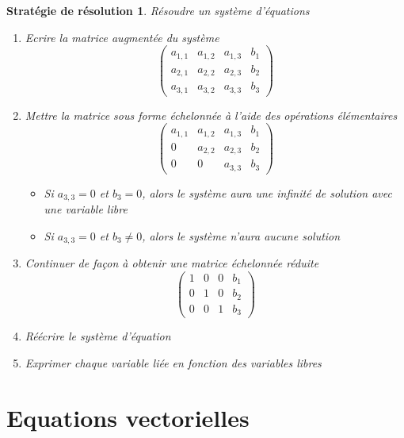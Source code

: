 \documentclass{article}
\newtheorem{strat}{Stratégie de résolution}[section]
\begin{document}
\begin{strat}
    Résoudre un système d'équations
    \begin{enumerate}
        \item Ecrire la matrice augmentée du système
        \[ \begin{pmatrix}
            a_{1,1} & a_{1,2} & a_{1,3} & b_1 \\ 
            a_{2,1} & a_{2,2} & a_{2,3} & b_2\\
            a_{3,1} & a_{3,2} & a_{3,3} & b_3
        \end{pmatrix} \]
        \item Mettre la matrice sous forme échelonnée à l'aide des opérations élémentaires
        \[ \begin{pmatrix}
            a_{1,1} & a_{1,2} & a_{1,3} & b_1 \\ 
            0 & a_{2,2} & a_{2,3} & b_2\\
            0 & 0 & a_{3,3} & b_3
        \end{pmatrix} \]
        \begin{itemize}
            \item Si \( a_{3,3} = 0\) et \(b_3 = 0 \), alors le système aura une infinité de solution avec une variable libre
            \item Si \( a_{3,3} = 0\) et \(b_3 \neq 0 \), alors le système n'aura aucune solution
        \end{itemize}
        \item Continuer de façon à obtenir une matrice échelonnée réduite
        \[ \begin{pmatrix}
            1 & 0 & 0 & b_1 \\ 
            0 & 1 & 0 & b_2\\
            0 & 0 & 1 & b_3
        \end{pmatrix} \]
        \item Réécrire le système d'équation
        \item Exprimer chaque variable liée en fonction des variables libres
    \end{enumerate}
\end{strat}
\section{Equations vectorielles}
\end{document}
